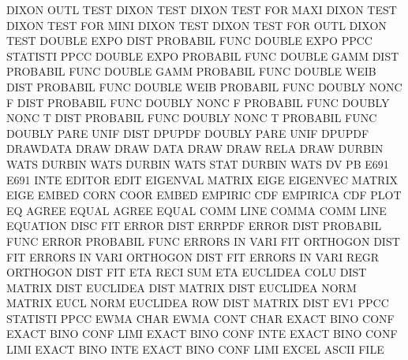 DIXON    OUTL TEST                      DIXON    TEST
DIXON    TEST FOR  MAXI                 DIXON    TEST
DIXON    TEST FOR  MINI                 DIXON    TEST
DIXON    TEST FOR  OUTL                 DIXON    TEST
DOUBLE   EXPO DIST                      PROBABIL FUNC
DOUBLE   EXPO PPCC                      STATISTI PPCC
DOUBLE   EXPO                           PROBABIL FUNC
DOUBLE   GAMM DIST                      PROBABIL FUNC
DOUBLE   GAMM                           PROBABIL FUNC
DOUBLE   WEIB DIST                      PROBABIL FUNC
DOUBLE   WEIB                           PROBABIL FUNC
DOUBLY   NONC F    DIST                 PROBABIL FUNC
DOUBLY   NONC F                         PROBABIL FUNC
DOUBLY   NONC T    DIST                 PROBABIL FUNC
DOUBLY   NONC T                         PROBABIL FUNC
DOUBLY   PARE UNIF DIST                 DPUPDF
DOUBLY   PARE UNIF                      DPUPDF
DRAWDATA                                DRAW
DRAW     DATA                           DRAW
DRAW     RELA                           DRAW
DURBIN   WATS                           DURBIN   WATS
DURBIN   WATS STAT                      DURBIN   WATS
DV                                      PB
E691                                    E691     INTE
EDITOR                                  EDIT
EIGENVAL                                MATRIX   EIGE
EIGENVEC                                MATRIX   EIGE
EMBED    CORN COOR                      EMBED
EMPIRIC  CDF                            EMPIRICA CDF  PLOT
EQ                                      AGREE
EQUAL                                   AGREE
EQUAL    COMM LINE                      COMMA    COMM LINE
EQUATION DISC                           FIT
ERROR    DIST                           ERRPDF
ERROR    DIST                           PROBABIL FUNC
ERROR                                   PROBABIL FUNC
ERRORS   IN   VARI FIT                  ORTHOGON DIST FIT
ERRORS   IN   VARI                      ORTHOGON DIST FIT
ERRORS   IN   VARI REGR                 ORTHOGON DIST FIT
ETA      RECI SUM                       ETA
EUCLIDEA COLU DIST                      MATRIX   DIST
EUCLIDEA DIST                           MATRIX   DIST
EUCLIDEA NORM                           MATRIX   EUCL NORM
EUCLIDEA ROW  DIST                      MATRIX   DIST
EV1      PPCC                           STATISTI PPCC
EWMA     CHAR                           EWMA     CONT CHAR
EXACT    BINO CONF                      EXACT    BINO CONF LIMI
EXACT    BINO CONF INTE                 EXACT    BINO CONF LIMI
EXACT    BINO INTE                      EXACT    BINO CONF LIMI
EXCEL                                   ASCII    FILE
